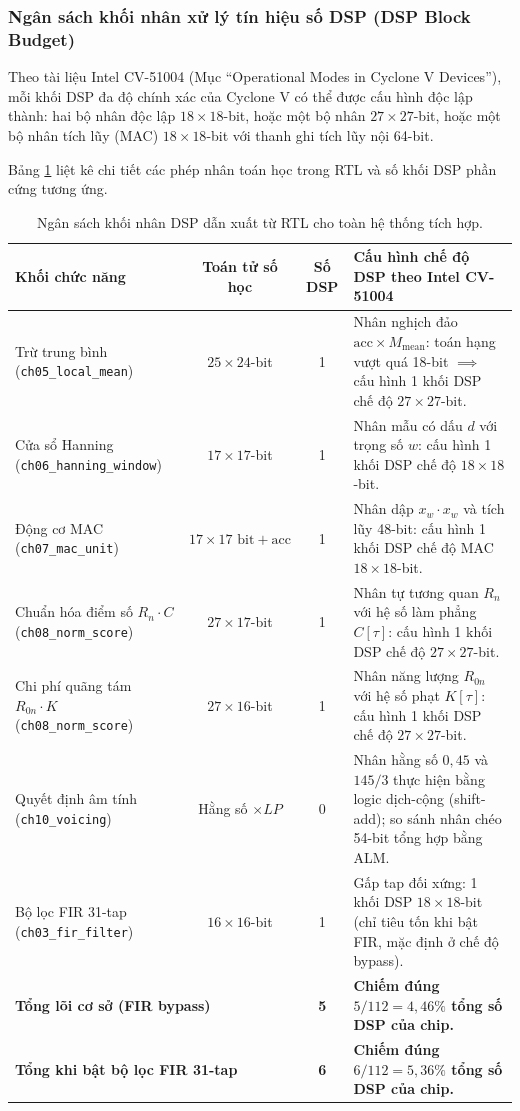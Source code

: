\subsubsection*{Ngân sách khối nhân xử lý tín hiệu số DSP (DSP Block Budget)}
Theo tài liệu Intel CV-51004 (Mục ``Operational Modes in Cyclone V Devices''), mỗi khối DSP đa độ chính xác của Cyclone V có thể được cấu hình độc lập thành:
hai bộ nhân độc lập $18 \times 18$-bit, hoặc một bộ nhân $27 \times 27$-bit, hoặc một bộ nhân tích lũy (MAC) $18 \times 18$-bit với thanh ghi tích lũy nội 64-bit.

Bảng \ref{tab:ch12_dsp_budget} liệt kê chi tiết các phép nhân toán học trong RTL và số khối DSP phần cứng tương ứng.

\begin{table}[htbp]
\centering
\small
\caption{Ngân sách khối nhân DSP dẫn xuất từ RTL cho toàn hệ thống tích hợp.}
\label{tab:ch12_dsp_budget}
\begin{tabularx}{\linewidth}{|l|c|c|X|}
\hline
\textbf{Khối chức năng} & \textbf{Toán tử số học} & \textbf{Số DSP} & \textbf{Cấu hình chế độ DSP theo Intel CV-51004} \\
\hline
Trừ trung bình (\texttt{ch05\_local\_mean}) & $25 \times 24$-bit & 1 & Nhân nghịch đảo $\text{acc} \times M_{\text{mean}}$: toán hạng vượt quá 18-bit $\implies$ cấu hình 1 khối DSP chế độ $27 \times 27$-bit. \\
\hline
Cửa sổ Hanning (\texttt{ch06\_hanning\_window}) & $17 \times 17$-bit & 1 & Nhân mẫu có dấu $d$ với trọng số $w$: cấu hình 1 khối DSP chế độ $18 \times 18$-bit. \\
\hline
Động cơ MAC (\texttt{ch07\_mac\_unit}) & $17 \times 17\text{ bit} + \text{acc}$ & 1 & Nhân dập $x_w \cdot x_w$ và tích lũy 48-bit: cấu hình 1 khối DSP chế độ MAC $18 \times 18$-bit. \\
\hline
Chuẩn hóa điểm số $R_n \cdot C$ (\texttt{ch08\_norm\_score}) & $27 \times 17$-bit & 1 & Nhân tự tương quan $R_n$ với hệ số làm phẳng $C[\tau]$: cấu hình 1 khối DSP chế độ $27 \times 27$-bit. \\
\hline
Chi phí quãng tám $R_{0n} \cdot K$ (\texttt{ch08\_norm\_score}) & $27 \times 16$-bit & 1 & Nhân năng lượng $R_{0n}$ với hệ số phạt $K[\tau]$: cấu hình 1 khối DSP chế độ $27 \times 27$-bit. \\
\hline
Quyết định âm tính (\texttt{ch10\_voicing}) & Hằng số $\times LP$ & 0 & Nhân hằng số $0{,}45$ và $145/3$ thực hiện bằng logic dịch-cộng (shift-add); so sánh nhân chéo 54-bit tổng hợp bằng ALM. \\
\hline
Bộ lọc FIR 31-tap (\texttt{ch03\_fir\_filter}) & $16 \times 16$-bit & 1 & Gấp tap đối xứng: 1 khối DSP $18 \times 18$-bit (chỉ tiêu tốn khi bật FIR, mặc định ở chế độ bypass). \\
\hline
\multicolumn{2}{|l|}{\textbf{Tổng lõi cơ sở (FIR bypass)}} & \textbf{5} & \textbf{Chiếm đúng $5 / 112 = 4{,}46\%$ tổng số DSP của chip.} \\
\hline
\multicolumn{2}{|l|}{\textbf{Tổng khi bật bộ lọc FIR 31-tap}} & \textbf{6} & \textbf{Chiếm đúng $6 / 112 = 5{,}36\%$ tổng số DSP của chip.} \\
\hline
\end{tabularx}
\end{table}

